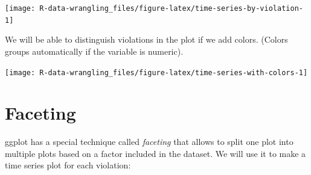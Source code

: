 \documentclass[]{book}
\newenvironment{Shaded}{\begin{snugshade}}{\end{snugshade}}
\newcommand{\DataTypeTok}[1]{\textcolor[rgb]{0.13,0.29,0.53}{#1}}
\newcommand{\KeywordTok}[1]{\textcolor[rgb]{0.13,0.29,0.53}{\textbf{#1}}}
\newcommand{\NormalTok}[1]{#1}
\newcommand{\OperatorTok}[1]{\textcolor[rgb]{0.81,0.36,0.00}{\textbf{#1}}}
\newcommand{\OtherTok}[1]{\textcolor[rgb]{0.56,0.35,0.01}{#1}}
\newcommand{\StringTok}[1]{\textcolor[rgb]{0.31,0.60,0.02}{#1}}
\begin{document}
\texttt{[image: R-data-wrangling\_files/figure-latex/time-series-by-violation-1]}

We will be able to distinguish violations in the plot if we add colors. (Colors groups automatically if the variable is numeric).

\begin{Shaded}
\end{Shaded}

\texttt{[image: R-data-wrangling\_files/figure-latex/time-series-with-colors-1]}

\hypertarget{faceting}{%
\section{Faceting}\label{faceting}}

ggplot has a special technique called \emph{faceting} that allows to split one plot
into multiple plots based on a factor included in the dataset. We will use it to
make a time series plot for each violation:

\begin{Shaded}
\end{Shaded}
\end{document}
